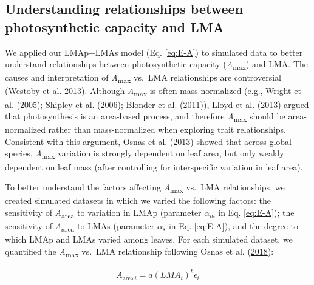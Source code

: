 \documentclass[
  12pt,
]{article}
\begin{document}
\hypertarget{understanding-relationships-between-photosynthetic-capacity-and-lma}{%
\subsection{Understanding relationships between photosynthetic capacity and LMA}\label{understanding-relationships-between-photosynthetic-capacity-and-lma}}

We applied our LMAp+LMAs model (Eq. \eqref{eq:E-A}) to simulated data to better understand relationships between photosynthetic capacity (\emph{A}\textsubscript{max}) and LMA.
The causes and interpretation of \emph{A}\textsubscript{max} vs.~LMA relationships are controversial (Westoby et al. \protect\hyperlink{ref-Westoby2013}{2013}).
Although \emph{A}\textsubscript{max} is often mass-normalized (e.g., Wright et al. (\protect\hyperlink{ref-Wright2005}{2005}); Shipley et al. (\protect\hyperlink{ref-Shipley2006}{2006}); Blonder et al. (\protect\hyperlink{ref-Blonder2011}{2011})), Lloyd et al. (\protect\hyperlink{ref-Lloyd2013}{2013}) argued that photosynthesis is an area-based process, and therefore \emph{A}\textsubscript{max} should be area-normalized rather than mass-normalized when exploring trait relationships.
Consistent with this argument, Osnas et al. (\protect\hyperlink{ref-Osnas2013}{2013}) showed that across global species, \emph{A}\textsubscript{max} variation is strongly dependent on leaf area, but only weakly dependent on leaf mass (after controlling for interspecific variation in leaf area).

To better understand the factors affecting \emph{A}\textsubscript{max} vs.~LMA relationships, we created simulated datasets in which we varied the following factors: the sensitivity of \emph{A}\textsubscript{area} to variation in LMAp (parameter \(\alpha_m\) in Eq. \eqref{eq:E-A}); the sensitivity of \emph{A}\textsubscript{area} to LMAs (parameter \(\alpha_s\) in Eq. \eqref{eq:E-A}), and the degree to which LMAp and LMAs varied among leaves.
For each simulated dataset, we quantified the \emph{A}\textsubscript{max} vs.~LMA relationship following Osnas et al. (\protect\hyperlink{ref-Osnas2018}{2018}):

\begin{align}
A_{\mathrm{area} \, i} = a (LMA_i)^{b}\epsilon_i \label{eq:mass}
\end{align}
\end{document}
